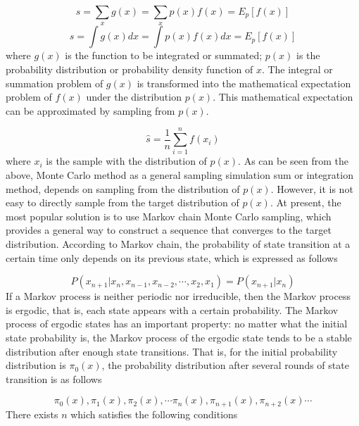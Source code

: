 \documentclass[final,3p,times]{elsarticle}
\begin{document}
	\begin{equation}\label{eq_monte_carlo_1}
	s =\sum\limits_x g(x)= \sum\limits_x {p(x)f(x) = {E_p}[f(x)]}
	\end{equation}
	\begin{equation}\label{eq_monte_carlo_2}
	s =\int {g(x)dx}= \int {p(x)f(x)dx}  = {E_p}[f(x)]
	\end{equation}
	where $g(x)$ is the function to be integrated or summated; $p(x)$ is the probability distribution or probability density function of $x$. The integral or summation problem of $g(x)$ is transformed into the mathematical expectation problem of $f(x)$ under the distribution $p(x)$. This mathematical expectation can be approximated by sampling from $p(x)$\cite{goodfellow2016deep}.
	
	\begin{equation}\label{eq_monte_carlo_3}
	\hat s = \frac{1}{n}\sum\limits_{i = 1}^n {f({x_i})}
	\end{equation}
	where $x_i$ is the sample with the distribution of $p(x)$. As can be seen from the above, Monte Carlo method as a general sampling simulation sum or integration method, depends on sampling from the distribution of $p(x)$. However, it is not easy to directly sample from the target distribution of $p(x)$. At present, the most popular solution is to use Markov chain Monte Carlo sampling, which provides a general way to construct a sequence that converges to the target distribution. According to Markov chain, the probability of state transition at a certain time only depends on its previous state, which is expressed as follows\cite{robert2013monte}
	
	\begin{equation}\label{eq_markov_chain_1}
	P({x_{n + 1}}\left| {{x_n},{x_{n - 1}}} \right.,{x_{n - 2}}, \cdots ,{x_2},{x_1}) = P({x_{n + 1}}\left| {{x_n}} \right.)
	\end{equation}
	If a Markov process is neither periodic nor irreducible, then the Markov process is ergodic, that is, each state appears with a certain probability. The Markov process of ergodic states has an important property: no matter what the initial state probability is, the Markov process of the ergodic state tends to be a stable distribution after enough state transitions\cite{robert2013monte}.
	That is, for the initial probability distribution is $\pi_0(x)$, the probability distribution after several rounds of state transition is as follows
	
	\begin{equation}\label{eq_markov_chain_2}
	\pi_{0}(x),\pi_{1}(x),\pi_{2}(x),\cdots \pi_{n}(x),\pi_{n+1}(x),\pi_{n+2}(x)\cdots
	\end{equation}
	There exists $n$ which satisfies the following conditions
	
\end{document}
